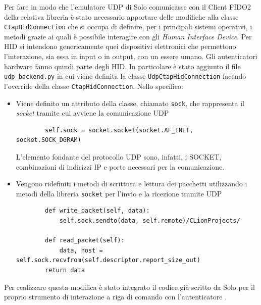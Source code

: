 Per fare in modo che l'emulatore UDP di Solo comunicasse con il Client FIDO2 della relativa libreria è stato necessario apportare delle modifiche alla classe \verb*|CtapHidConnection| che si occupa di definire, per i principali sistemi operativi, i metodi grazie ai quali è possibile interagire con gli \emph{Human Interface Device}. Per HID si intendono genericamente quei dispositivi elettronici che permettono l'interazione, sia essa in input o in output, con un essere umano. Gli autenticatori hardware fanno quindi parte degli HID. 
In particolare è stato aggiunto il file \verb*|udp_backend.py| in cui viene definita la classe \verb*|UdpCtapHidConnection| facendo l'override della classe \verb*|CtapHidConnection|. Nello specifico:
\begin{itemize}
	\item Viene definito un attributo della classe, chiamato \verb*|sock|, che rappresenta il \emph{socket} tramite cui avviene la comunicazione UDP
	\begin{verbatim}
		self.sock = socket.socket(socket.AF_INET, socket.SOCK_DGRAM)
	\end{verbatim}
	L'elemento fondante del protocollo UDP sono, infatti, i SOCKET, combinazioni di indirizzi IP e porte necessari per la comunicazione.
	\item Vengono ridefiniti i metodi di scrittura e lettura dei pacchetti utilizzando i metodi della libreria \verb*|socket| per l'invio e la ricezione tramite UDP
	\begin{verbatim}
        def write_packet(self, data):
            self.sock.sendto(data, self.remote)/CLionProjects/
		
        def read_packet(self):
            data, host = self.sock.recvfrom(self.descriptor.report_size_out)
        return data
	\end{verbatim}
\end{itemize}
Per realizzare questa modifica è stato integrato il codice già scritto da Solo per il proprio strumento di interazione a riga di comando con l'autenticatore \cite{solo1-cli:udp_backend}.